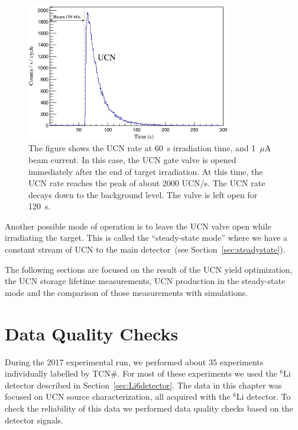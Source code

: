 \begin{figure}[h!]
  \centering
  \includegraphics[width=0.8\textwidth]{UCNRate.png}
  \caption[UCN rate at 1~$\mu$A beam current and 60~s target
  irradiation]{The figure shows the UCN rate at 60~s irradiation time,
    and 1~$\mu$A beam current. In this case, the UCN gate valve is
    opened immediately after the end of target irradiation. At this
    time, the UCN rate reaches the peak of about 2000 UCN/s. The UCN
    rate decays down to the background level. The valve is left open
    for 120~s. }
  \label{fig:UCNRate}
\end{figure}


Another possible mode of operation is to leave the UCN valve open
while irradiating the target. This is called the ``steady-state mode''
where we have a constant stream of UCN to the main detector~(see
Section~\ref{sec:steadystate}).

The following sections are focused on the result of the UCN yield
optimization, the UCN storage lifetime measurements, UCN production in
the steady-state mode and the comparison of those measurements with
simulations.


\section {Data Quality Checks~\label{sec:DQC}}
During the 2017 experimental run, we performed about 35 experiments
individually labelled by TCN\#. For most of these experiments we used
the $^6\mathrm{Li}$ detector described in
Section~\ref{sec:Li6detector}. The data in this chapter was focused on
UCN source characterization, all acquired with the $^6\mathrm{Li}$
detector.  To check the reliability of this data we performed data
quality checks based on the detector signals.



